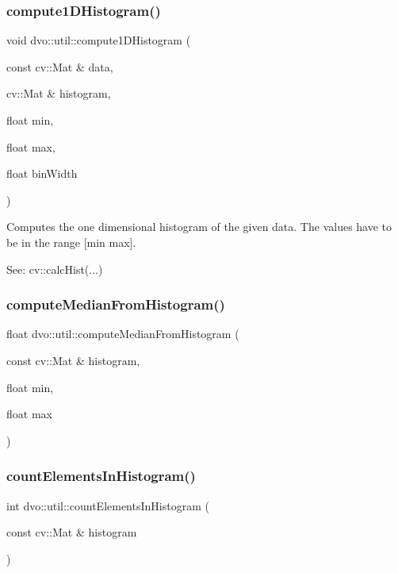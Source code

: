 \subsubsection{\texorpdfstring{compute1\+D\+Histogram()}{compute1DHistogram()}}
{\footnotesize\ttfamily void dvo\+::util\+::compute1\+D\+Histogram (\begin{DoxyParamCaption}\item[{const cv\+::\+Mat \&}]{data,  }\item[{cv\+::\+Mat \&}]{histogram,  }\item[{float}]{min,  }\item[{float}]{max,  }\item[{float}]{bin\+Width }\end{DoxyParamCaption})}

Computes the one dimensional histogram of the given data. The values have to be in the range \mbox{[}min max\mbox{]}.

See\+: cv\+::calc\+Hist(...) \mbox{\label{namespacedvo_1_1util_af0fef1368b12563b7e623482aef1725a}} 
\subsubsection{\texorpdfstring{compute\+Median\+From\+Histogram()}{computeMedianFromHistogram()}}
{\footnotesize\ttfamily float dvo\+::util\+::compute\+Median\+From\+Histogram (\begin{DoxyParamCaption}\item[{const cv\+::\+Mat \&}]{histogram,  }\item[{float}]{min,  }\item[{float}]{max }\end{DoxyParamCaption})}

\mbox{\label{namespacedvo_1_1util_a1978d9c686a6ed8e7d373bd922b58deb}} 
\subsubsection{\texorpdfstring{count\+Elements\+In\+Histogram()}{countElementsInHistogram()}}
{\footnotesize\ttfamily int dvo\+::util\+::count\+Elements\+In\+Histogram (\begin{DoxyParamCaption}\item[{const cv\+::\+Mat \&}]{histogram }\end{DoxyParamCaption})}


